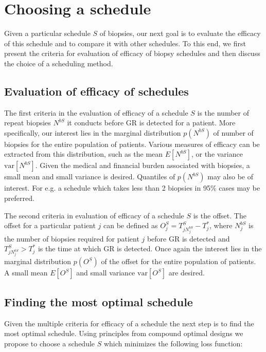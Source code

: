
\section{Choosing a schedule}
\label{sec : choosing_schedule}
Given a particular schedule $S$ of biopsies, our next goal is to evaluate the efficacy of this schedule and to compare it with other schedules. To this end, we first present the criteria for evaluation of efficacy of biopsy schedules and then discuss the choice of a scheduling method.

\subsection{Evaluation of efficacy of schedules}
The first criteria in the evaluation of efficacy of a schedule $S$ is the number of repeat biopsies $N^{bS}$ it conducts before GR is detected for a patient. More specifically, our interest lies in the marginal distribution $p(N^{bS})$ of number of biopsies for the entire population of patients. Various measures of efficacy can be extracted from this distribution, such as the mean $E[N^{bS}]$, or the variance $\mbox{var}[N^{bS}]$. Given the medical and financial burden associated with biopsies, a small mean and small variance is desired. Quantiles of $p(N^{bS})$ may also be of interest. For e.g. a schedule which takes less than 2 biopsies in 95\% cases may be preferred.

The second criteria in evaluation of efficacy of a schedule $S$ is the offset. The offset for a particular patient $j$ can be defined as $O^S_j = T^S_{j{N^{bS}_j}} - T^*_j$, where $N^{bS}_j$ is the number of biopsies required for patient $j$ before GR is detected and $T^S_{j{N^{bS}_j}} > T^*_j$ is the time at which GR is detected. Once again the interest lies in the marginal distribution $p(O^S)$ of the offset for the entire population of patients. A small mean $E[O^S]$ and small variance $\mbox{var}[O^S]$ are desired.

\subsection{Finding the most optimal schedule}
Given the multiple criteria for efficacy of a schedule the next step is to find the most optimal schedule. Using principles from compound optimal designs \citep{lauter1976optimal} we propose to choose a schedule $S$ which minimizes the following loss function:

